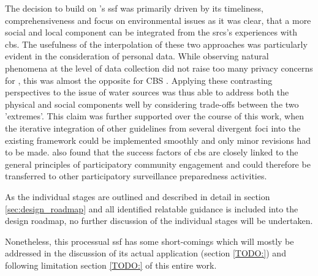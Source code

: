 The decision to build on \autocite{fraislCitizenScienceEnvironmental2022}'s \acrlong{ssf} was primarily driven by its timeliness, comprehensiveness and focus on environmental issues as it was clear, that a more social and local component can be integrated from the \acrshort{srcs}'s experiences with \acrshort{cbs}. The usefulness of the interpolation of these two approaches was particularly evident in the consideration of personal data. While observing natural phenomena at the level of data collection did not raise too many privacy concerns for \autocite{fraislCitizenScienceEnvironmental2022}, this was almost the opposite for CBS \autocite{ifrcCommunityBasedSurveillanceGuiding2017}. Applying these contrasting perspectives to the issue of water sources was thus able to address both the physical and social components well by considering trade-offs between the two 'extremes'. This claim was further supported over the course of this work, when the iterative integration of other guidelines from several divergent foci into the existing framework could be implemented smoothly and only minor revisions had to be made. \autocite{mcgowanCommunitybasedSurveillanceInfectious2022} also found that the success factors of \acrshort{cbs} are closely linked to the general principles of participatory community engagement and could therefore be transferred to other participatory surveillance preparedness activities. 

As the individual stages are outlined and described in detail in section \ref{sec:design_roadmap} and all identified relatable guidance is included into the design roadmap, no further discussion of the individual stages will be undertaken. %



Nonetheless, this processual \acrshort{ssf} has some short-comings which will mostly be addressed in the discussion of its actual application (section \ref{TODO:}) and following limitation section \ref{TODO:} of this entire work.\newline


